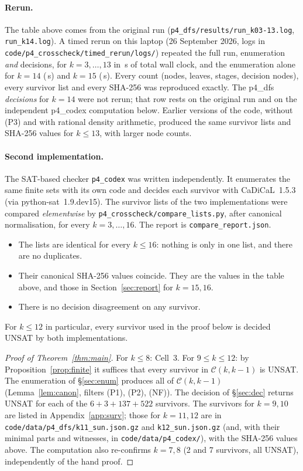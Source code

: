 \documentclass[11pt]{article}
\theoremstyle{definition}
\theoremstyle{remark}
\newcommand{\C}{\mathcal{C}}
\begin{document}
\paragraph{Rerun.}{\sloppy
The table above comes from the original run (\texttt{p4\_dfs/results/run\_k03-13.log},
\texttt{run\_k14.log}). A timed rerun on this laptop (26 September 2026, logs in
\texttt{code/p4\_crosscheck/timed\_rerun/logs/}) repeated the full run, enumeration \emph{and}
decisions, for $k=3,\dots,13$ in \tSmallDFS\,s of total wall clock, and the enumeration alone for
$k=14$ (\tXIVdfs\,s) and $k=15$ (\tXVdfs\,s). Every count (nodes, leaves, stages, decision nodes),
every survivor list and every SHA-256 was reproduced exactly. The p4\_dfs \emph{decisions} for
$k=14$ were not rerun; that row rests on the original run and on the independent p4\_codex
computation below. Earlier versions of the code, without (P3) and with rational
density arithmetic, produced the same survivor lists and SHA-256 values for $k\le13$, with larger
node counts.\par}

\paragraph{Second implementation.}
The SAT-based checker \texttt{p4\_codex} was written independently. It enumerates the same
finite sets with its own code and decides each survivor with CaDiCaL~1.5.3 (via
python-sat~1.9.dev15). The survivor lists of the two implementations were compared
\emph{elementwise} by \texttt{p4\_crosscheck/compare\_lists.py}, after canonical normalisation, for
every $k=3,\dots,16$. The report is \texttt{compare\_report.json}.
\begin{itemize}
\item The lists are identical for every $k\le16$: nothing is only in one list, and there are no
  duplicates.
\item Their canonical SHA-256 values coincide. They are the values in the table above, and those
  in Section~\ref{sec:report} for $k=15,16$.
\item There is no decision disagreement on any survivor.
\end{itemize}
For $k\le12$ in particular, every survivor used in the proof below is decided UNSAT by both
implementations.

\begin{proof}[Proof of Theorem~\ref{thm:main}]
For $k\le8$: Cell~3. For $9\le k\le12$: by Proposition~\ref{prop:finite} it suffices that every
survivor in $\C(k,k-1)$ is UNSAT. The enumeration of \S\ref{sec:enum} produces all of
$\C(k,k-1)$ (Lemma~\ref{lem:canon}, filters (P1), (P2), (NF)). The decision of \S\ref{sec:dec}
returns UNSAT for each of the $6+3+137+522$ survivors. The survivors for $k=9,10$ are listed in
Appendix~\ref{app:surv}; those for $k=11,12$ are in \texttt{code/data/p4\_dfs/k11\_sun.json.gz} and
\texttt{k12\_sun.json.gz} (and, with their minimal parts and witnesses, in
\texttt{code/data/p4\_codex/}), with the SHA-256
values above. The computation also re-confirms $k=7,8$ (2 and 7 survivors, all UNSAT),
independently of the hand proof.
\end{proof}
\end{document}
